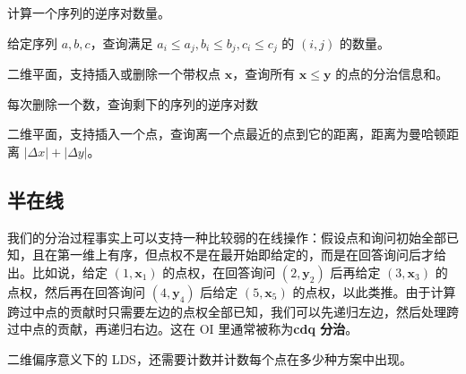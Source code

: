 \begin{exercise}[二维偏序]
    计算一个序列的逆序对数量。
\end{exercise}
\begin{exercise}[三维偏序]
    给定序列 $a,b,c$，查询满足 $a_i\le a_j,b_i\le b_j,c_i\le c_j$ 的 $(i,j)$ 的数量。
\end{exercise}
\begin{exercise}[带修二维数点]
    二维平面，支持插入或删除一个带权点 $\mathbf x$，查询所有 $\mathbf x\le \mathbf y$ 的点的分治信息和。
\end{exercise}
\begin{exercise}[P3157]
    每次删除一个数，查询剩下的序列的逆序对数
\end{exercise}
\begin{exercise}[P4169]
    二维平面，支持插入一个点，查询离一个点最近的点到它的距离，距离为曼哈顿距离 $|\Delta x|+|\Delta y|$。
\end{exercise}

\subsection{半在线}

我们的分治过程事实上可以支持一种比较弱的在线操作：假设点和询问初始全部已知，且在第一维上有序，但点权不是在最开始即给定的，而是在回答询问后才给出。比如说，给定 $(1,\mathbf x_1)$ 的点权，在回答询问 $(2,\mathbf y_2)$ 后再给定 $(3,\mathbf x_3)$ 的点权，然后再在回答询问 $(4,\mathbf y_4)$ 后给定 $(5,\mathbf x_5)$ 的点权，以此类推。由于计算跨过中点的贡献时只需要左边的点权全部已知，我们可以先递归左边，然后处理跨过中点的贡献，再递归右边。这在 OI 里通常被称为\textbf{cdq 分治}。

\begin{exercise}[P2487]
    二维偏序意义下的 LDS，还需要计数并计数每个点在多少种方案中出现。
\end{exercise}

\begin{exercise}[P4093]
\end{exercise}


